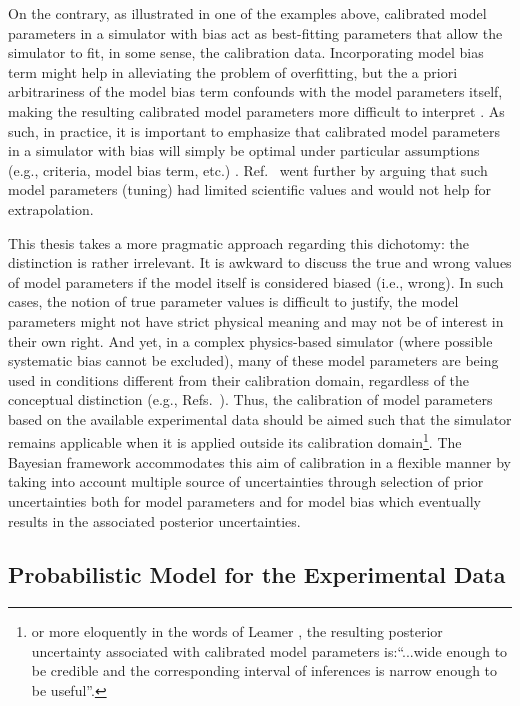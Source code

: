 On the contrary, as illustrated in one of the examples above, calibrated model parameters in a simulator with bias act as best-fitting parameters that allow the simulator to fit, in some sense, the calibration data.
Incorporating model bias term might help in alleviating the problem of overfitting, but the a priori arbitrariness of the model bias term confounds with the model parameters itself, making the resulting calibrated model parameters more difficult to interpret \cite{Higdon2004}.
As such, in practice, it is important to emphasize that calibrated model parameters in a simulator with bias will simply be optimal under particular assumptions (e.g., criteria, model bias term, etc.) \cite{Campbell2006}.
Ref.~\cite{Brynjarsdottir2014} went further by arguing that such model parameters (tuning) had limited scientific values and would not help for extrapolation.

This thesis takes a more pragmatic approach regarding this dichotomy: the distinction is rather irrelevant.
It is awkward to discuss the true and wrong values of model parameters if the model itself is considered biased (i.e., wrong).
In such cases, the notion of true parameter values is difficult to justify, the model parameters might not have strict physical meaning and may not be of interest in their own right.
And yet, in a complex physics-based simulator (where possible systematic bias cannot be excluded), many of these model parameters are being used in conditions different from their calibration domain, regardless of the conceptual distinction (e.g., Refs.~\cite{Arendt2012,USNRC2012}).
Thus, the calibration of model parameters based on the available experimental data should be aimed such that the simulator remains applicable when it is applied outside its calibration domain\footnote{or more eloquently in the words of Leamer \cite{Saltelli2006}, the resulting posterior uncertainty associated with calibrated model parameters is:``...wide enough to be credible and the corresponding interval of inferences is narrow enough to be useful''.}.
The Bayesian framework accommodates this aim of calibration in a flexible manner by taking into account multiple source of uncertainties through selection of prior uncertainties both for model parameters and for model bias which eventually results in the associated posterior uncertainties.

\subsection{Probabilistic Model for the Experimental Data}\label{sub:bc_modular_data}

